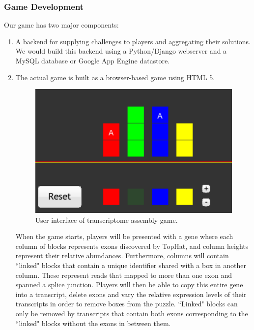 \documentclass[12pt]{article}
\begin{document}
\subsubsection*{Game Development}
Our game has two major components:
\begin{enumerate}
\item A backend for supplying challenges to players and aggregating their solutions. We would build this backend using a Python/Django webserver and a MySQL database or Google App Engine datastore.
\item The actual game is built as a browser-based game using HTML 5.

\begin{figure}[H]
\includegraphics[scale=0.5]{gameshot.png}
\caption{User interface of transcriptome assembly game.}
\centering
\label{fig:proposedui}
\end{figure}

When the game starts, players will be presented with a gene where each column of blocks represents exons discovered by TopHat, and column heights represent their relative abundances. Furthermore, columns will contain ``linked" blocks that contain a unique identifier shared with a box in another column.
These represent reads that mapped to more than one exon and spanned a splice junction. Players will then be able to copy this entire gene into a transcript, delete exons and vary the relative expression levels of their transcripts in order to remove boxes from the puzzle. ``Linked" blocks can only be removed by
transcripts that contain both exons corresponding to the ``linked" blocks without the exons in between them.


\end{enumerate}
\end{document}
